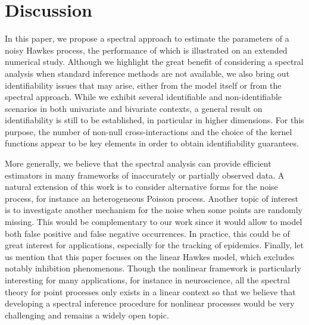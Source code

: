 		\section{Discussion}

In this paper, we propose a spectral approach to estimate the parameters of a noisy Hawkes process, the performance of which is illustrated on an extended numerical study. Although we highlight the great benefit of considering a spectral analysis when standard inference methods are not available, we also bring out  identifiability issues that may arise, either from the model itself or from the spectral approach. While we exhibit several identifiable and non-identifiable scenarios in both univariate and bivariate contexts, a general result on identifiability is still to be established, in particular in higher dimensions. For this purpose, the number of non-null cross-interactions and the choice of the kernel functions appear to be key elements in order to obtain identifiability guarantees.

More generally, we believe that the spectral analysis can provide efficient estimators in many frameworks of inaccurately or partially observed data. A natural extension of this work is to consider alternative forms for the noise process, for instance an heterogeneous Poisson process. Another topic of interest is to investigate another mechanism for the noise when some points are randomly missing. This would be complementary to our work since it would allow to model both false positive and false negative occurrences. In practice, this could be of great interest for applications, especially for the tracking of epidemics. Finally, let us mention that this paper focuses on the linear Hawkes model, which excludes notably inhibition phenomenons. Though the nonlinear framework is particularly interesting for many applications, for instance in neuroscience, all the spectral theory for point processes only exists in a linear context so that we believe that developing a spectral inference procedure for nonlinear processes would be very challenging and remains a widely open topic.

